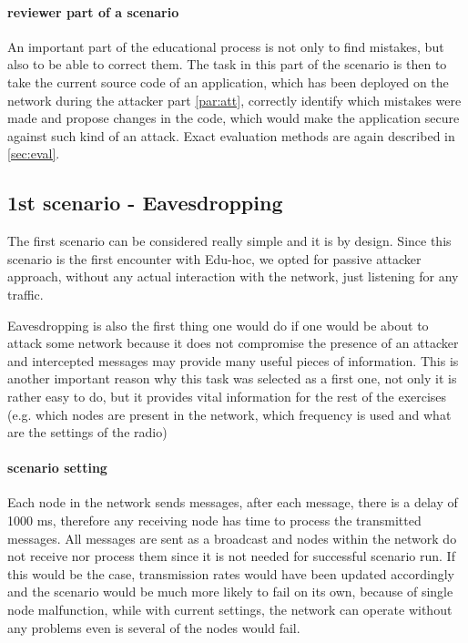 \documentclass[
  print, %
  table,   %
  nolof,     %
  nolot,     %
           oneside
]{fithesis3}
\begin{document}
  \paragraph{reviewer part of a scenario}
    An important part of the educational process is not only to find mistakes, but also to be able to correct them. The task in this part of the scenario is then to take the current source code of an application, which has been deployed on the network during the attacker part \ref{par:att}, correctly identify which mistakes were made and propose changes in the code, which would make the application secure against such kind of an attack. Exact evaluation methods are again described in \ref{sec:eval}.


    \subsection{1st scenario - Eavesdropping}\label{subsec:1st}
    The first scenario can be considered really simple and it is by design. Since this scenario is the first encounter with Edu-hoc, we opted for passive attacker approach, without any actual interaction with the network, just listening for any traffic.

    Eavesdropping is also the first thing one would do if one would be about to attack some network because it does not compromise the presence of an attacker and intercepted messages may provide many useful pieces of information. This is another important reason why this task was selected as a first one, not only it is rather easy to do, but it provides vital information for the rest of the exercises (e.g. which nodes are present in the network, which frequency is used and what are the settings of the radio)

    \paragraph{scenario setting}
    Each node in the network sends messages, after each message, there is a delay of 1000 ms, therefore any receiving node has time to process the transmitted messages. All messages are sent as a broadcast and nodes within the network do not receive nor process them since it is not needed for successful scenario run. If this would be the case, transmission rates would have been updated accordingly and the scenario would be much more likely to fail on its own, because of single node malfunction, while with current settings, the network can operate without any problems even is several of the nodes would fail.
\end{document}
